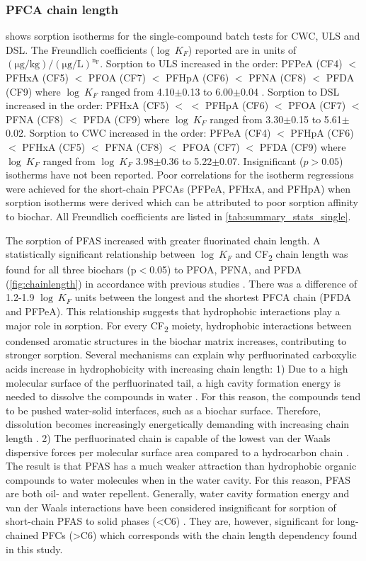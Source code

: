 \subsubsection{PFCA chain length}
 shows sorption isotherms for the single-compound batch tests for CWC, ULS and DSL. The Freundlich coefficients ($\log~K_F$) reported are in units of $\mathrm{(\mu g/kg)/(\mu g/L)^{n_F}}$. Sorption to ULS increased in the order: PFPeA (CF4) $<$ PFHxA (CF5) $<$ PFOA (CF7) $<$ PFHpA (CF6) $<$ PFNA (CF8) $<$ PFDA (CF9) where $\log~K_F$ ranged from 4.10$\pm$0.13 to 6.00$\pm$0.04 . Sorption to DSL increased in the order: PFHxA (CF5) $<$ $<$ PFHpA (CF6) $<$ PFOA (CF7) $<$ PFNA (CF8) $<$ PFDA (CF9) where $\log~K_F$ ranged from 3.30$\pm$0.15 to 5.61$\pm$0.02. Sorption to CWC increased in the order: PFPeA (CF4) $<$ PFHpA (CF6) $<$ PFHxA (CF5) $<$ PFNA (CF8) $<$ PFOA (CF7) $<$ PFDA (CF9) where $\log~K_F$ ranged from $\log~K_F$ 3.98$\pm$0.36 to 5.22$\pm$0.07. Insignificant ($p>0.05$) isotherms have not been reported. Poor correlations for the isotherm regressions were achieved for the short-chain PFCAs (PFPeA, PFHxA, and PFHpA) when sorption isotherms were derived which can be attributed to poor sorption affinity to biochar. All Freundlich coefficients are listed in \cref{tab:summary_stats_single}. 

The sorption of PFAS increased with greater fluorinated chain length. A statistically significant relationship between $\log~K_F$ and CF\textsubscript{2} chain length was found for all three biochars (p$<$0.05) to PFOA, PFNA, and PFDA (\cref{fig:chainlength}) in accordance with previous studies \citep{Sorengard2019, fabregat2022examining, ahmed2020per}. There was a difference of 1.2-1.9 $\log~K_F$ units between the longest and the shortest PFCA chain (PFDA and PFPeA). This relationship suggests that hydrophobic interactions play a major role in sorption. For every CF\textsubscript{2} moiety, hydrophobic interactions between condensed aromatic structures in the biochar matrix increases, contributing to stronger sorption. Several mechanisms can explain why perfluorinated carboxylic acids increase in hydrophobicity with increasing chain length: 1) Due to a high molecular surface of the perfluorinated tail, a high cavity formation energy is needed to dissolve the compounds in water \citep{Arp2006}. For this reason, the compounds tend to be pushed water-solid interfaces, such as a biochar surface. Therefore, dissolution becomes increasingly energetically demanding with increasing chain length \citep{sigmund2022sorption}. 2) The perfluorinated chain is capable of the lowest van der Waals dispersive forces per molecular surface area compared to a hydrocarbon chain \citep{du2014adsorption}. The result is that PFAS has a much weaker attraction than hydrophobic organic compounds to water molecules when in the water cavity. For this reason, PFAS are both oil- and water repellent.  Generally, water cavity formation energy and van der Waals interactions have been considered insignificant for sorption of short-chain PFAS to solid phases (\textless C6) \citep{du2014adsorption}. They are, however, significant for long-chained PFCs (\textgreater C6) \citep{du2014adsorption} which corresponds with the chain length dependency found in this study.

